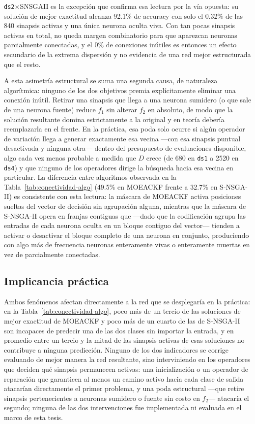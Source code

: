 \texttt{ds2}$\times$SNSGAII es la excepción que confirma esa lectura por la vía opuesta: su solución de mejor exactitud alcanza 92.1\% de accuracy con solo el 0.32\% de las 840 sinapsis activas y una única neurona oculta viva. Con tan pocas sinapsis activas en total, no queda margen combinatorio para que aparezcan neuronas parcialmente conectadas, y el 0\% de conexiones inútiles es entonces un efecto secundario de la extrema dispersión y no evidencia de una red mejor estructurada que el resto.

A esta asimetría estructural se suma una segunda causa, de naturaleza algorítmica: ninguno de los dos objetivos premia explícitamente eliminar una conexión inútil. Retirar una sinapsis que llega a una neurona sumidero (o que sale de una neurona fuente) reduce $f_1$ sin alterar $f_2$ en absoluto, de modo que la solución resultante domina estrictamente a la original y en teoría debería reemplazarla en el frente. En la práctica, esa poda solo ocurre si algún operador de variación llega a generar exactamente esa vecina —con esa sinapsis puntual desactivada y ninguna otra— dentro del presupuesto de evaluaciones disponible, algo cada vez menos probable a medida que $D$ crece (de 680 en \texttt{ds1} a 2520 en \texttt{ds4}) y que ninguno de los operadores dirige la búsqueda hacia esa vecina en particular. La diferencia entre algoritmos observada en la Tabla~\ref{tab:conectividad-algo} (49.5\% en MOEACKF frente a 32.7\% en S-NSGA-II) es consistente con esta lectura: la máscara de MOEACKF activa posiciones sueltas del vector de decisión sin agrupación alguna, mientras que la máscara de S-NSGA-II opera en franjas contiguas que —dado que la codificación agrupa las entradas de cada neurona oculta en un bloque contiguo del vector— tienden a activar o desactivar el bloque completo de una neurona en conjunto, produciendo con algo más de frecuencia neuronas enteramente vivas o enteramente muertas en vez de parcialmente conectadas.

\subsection{Implicancia práctica}

Ambos fenómenos afectan directamente a la red que se desplegaría en la práctica: en la Tabla~\ref{tab:conectividad-algo}, poco más de un tercio de las soluciones de mejor exactitud de MOEACKF y poco más de un cuarto de las de S-NSGA-II son incapaces de predecir una de las dos clases sin importar la entrada, y en promedio entre un tercio y la mitad de las sinapsis activas de esas soluciones no contribuye a ninguna predicción. Ninguno de los dos indicadores se corrige evaluando de mejor manera la red resultante, sino interviniendo en los operadores que deciden qué sinapsis permanecen activas: una inicialización o un operador de reparación que garanticen al menos un camino activo hacia cada clase de salida atacarían directamente el primer problema, y una poda estructural —que retire sinapsis pertenecientes a neuronas sumidero o fuente sin costo en $f_2$— atacaría el segundo; ninguna de las dos intervenciones fue implementada ni evaluada en el marco de esta tesis.
